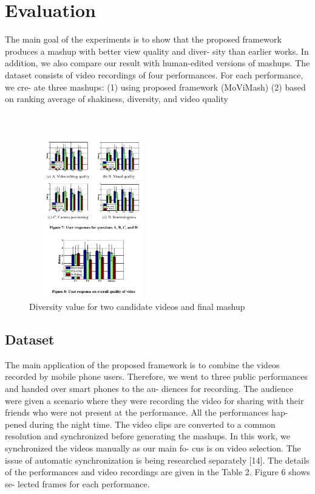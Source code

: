 \documentclass{sig-alternate}
\begin{document}
\section{Evaluation}
The main goal of the experiments is to show that the proposed
framework produces a mashup with better view quality and diver-
sity than earlier works. In addition, we also compare our result with
human-edited versions of mashups. The dataset consists of video
recordings of four performances. For each performance, we cre-
ate three mashups: (1) using proposed framework (MoViMash) (2)
based on ranking average of shakiness, diversity, and video quality\\ \\ \\

 \begin{figure}[h]
\includegraphics[width=0.5\textwidth ,height = 7cm]{9}
\caption{Diversity value for two candidate videos and ﬁnal mashup}
\label{fig:figure5}
\end{figure}

\subsection{Dataset}
The main application of the proposed framework is to combine
the videos recorded by mobile phone users. Therefore, we went to
three public performances and handed over smart phones to the au-
diences for recording. The audience were given a scenario where
they were recording the video for sharing with their friends who
were not present at the performance. All the performances hap-
pened during the night time. The video clips are converted to a
common resolution and synchronized before generating the mashups.
In this work, we synchronized the videos manually as our main fo-
cus is on video selection. The issue of automatic synchronization is
being researched separately [14]. The details of the performances
and video recordings are given in the Table 2. Figure 6 shows se-
lected frames for each performance.
\end{document}
